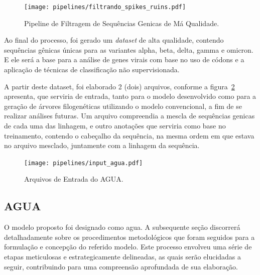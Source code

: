 \begin{enumerate}
        \begin{figure}[htb]
          \centering
          \caption{Pipeline de Filtragem de Sequências Genicas de Má Qualidade.}
          \texttt{[image: pipelines/filtrando\_spikes\_ruins.pdf]}
          ~\label{fig:spikesRuins}
        \end{figure}
\end{enumerate}

Ao final do processo, foi gerado um \textit{dataset} de alta qualidade, contendo sequências gênicas únicas para as variantes alpha, beta, delta, gamma e omicron. E ele será a base para a análise de genes virais com base no uso de códons e a aplicação de técnicas de classificação não supervisionada.

A partir deste dataset, foi elaborado 2 (dois) arquivos, conforme a figura~\ref{fig:inputAgua} apresenta, que serviria de entrada, tanto para o modelo desenvolvido como para a geração de árvores filogenéticas utilizando o modelo convencional, a fim de se realizar análises futuras. Um arquivo compreendia a mescla de sequências genicas de cada uma das linhagem, e outro anotações que serviria como base no treinamento, contendo o cabeçalho da sequência, na mesma ordem em que estava no arquivo mesclado, juntamente com a linhagem da sequência.

\begin{figure}[htb]
  \centering
  \caption{Arquivos de Entrada do AGUA.}
  \texttt{[image: pipelines/input\_agua.pdf]}
  ~\label{fig:inputAgua}
\end{figure}

\subsection{AGUA}
O modelo proposto foi designado como \gls{agua}. A subsequente seção discorrerá detalhadamente sobre os procedimentos metodológicos que foram seguidos para a formulação e concepção do referido modelo. Este processo envolveu uma série de etapas meticulosas e estrategicamente delineadas, as quais serão elucidadas a seguir, contribuindo para uma compreensão aprofundada de sua elaboração.


